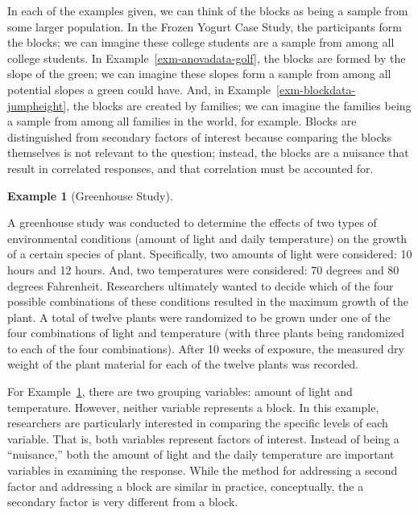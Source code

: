 \documentclass[
  letterpaper,
  DIV=11,
  numbers=noendperiod]{scrreprt}
\theoremstyle{definition}
\theoremstyle{definition}
\newtheorem{example}{Example}[chapter]
\theoremstyle{plain}
\theoremstyle{remark}
\begin{document}
In each of the examples given, we can think of the blocks as being a
sample from some larger population. In the Frozen Yogurt Case Study, the
participants form the blocks; we can imagine these college students are
a sample from among all college students. In
Example~\ref{exm-anovadata-golf}, the blocks are formed by the slope of
the green; we can imagine these slopes form a sample from among all
potential slopes a green could have. And, in
Example~\ref{exm-blockdata-jumpheight}, the blocks are created by
families; we can imagine the families being a sample from among all
families in the world, for example. Blocks are distinguished from
secondary factors of interest because comparing the blocks themselves is
not relevant to the question; instead, the blocks are a nuisance that
result in correlated responses, and that correlation must be accounted
for.

\begin{example}[Greenhouse
Study]\protect\hypertarget{exm-blockdata-greenhouse}{}\label{exm-blockdata-greenhouse}

A greenhouse study was conducted to determine the effects of two types
of environmental conditions (amount of light and daily temperature) on
the growth of a certain species of plant. Specifically, two amounts of
light were considered: 10 hours and 12 hours. And, two temperatures were
considered: 70 degrees and 80 degrees Fahrenheit. Researchers ultimately
wanted to decide which of the four possible combinations of these
conditions resulted in the maximum growth of the plant. A total of
twelve plants were randomized to be grown under one of the four
combinations of light and temperature (with three plants being
randomized to each of the four combinations). After 10 weeks of
exposure, the measured dry weight of the plant material for each of the
twelve plants was recorded.

\end{example}

For Example~\ref{exm-blockdata-greenhouse}, there are two grouping
variables: amount of light and temperature. However, neither variable
represents a block. In this example, researchers are particularly
interested in comparing the specific levels of each variable. That is,
both variables represent factors of interest. Instead of being a
``nuisance,'' both the amount of light and the daily temperature are
important variables in examining the response. While the method for
addressing a second factor and addressing a block are similar in
practice, conceptually, the a secondary factor is very different from a
block.
\end{document}
